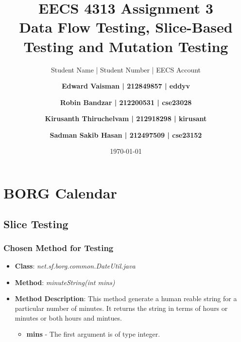 \documentclass[fontsize=12pt,paper=letter,twoside]{scrartcl}
\author{Student Name | Student Number | EECS Account
\and \textbf{Edward Vaisman | 212849857 | eddyv}
\and \textbf{Robin Bandzar | 212200531 | cse23028}
\and \textbf{Kirusanth Thiruchelvam | 212918298 | kirusant}
\and \textbf{Sadman Sakib Hasan | 212497509 | cse23152}
}
\date{\today} %
\begin{document}
\title{EECS 4313 Assignment 3 \\Data Flow Testing, Slice-Based Testing and Mutation Testing}
\maketitle

\newpage

\tableofcontents


\newpage


\section{BORG Calendar}
\subsection{Slice Testing}

\subsubsection{Chosen Method for Testing}

\begin{itemize}
\item \textbf{Class}: \emph{net.sf.borg.common.DateUtil.java}
\item \textbf{Method}: \emph{minuteString(int mins)}
\item \textbf{Method Description}:
This method generate a human reable string for a particular number of minutes. It returns the string in terms of hours or minutes or both hours and mintues.
\begin{itemize}
\item \textbf{mins} - The first argument is of type integer.
\end{itemize}
\end{itemize}
\end{document}
